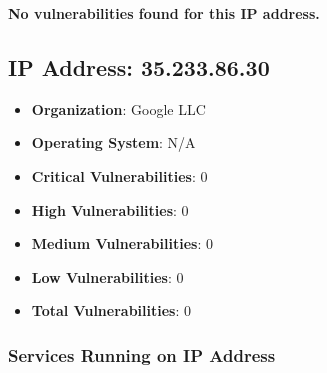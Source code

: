 \documentclass{article}
\begin{document}
\textbf{No vulnerabilities found for this IP address.}




\clearpage



\subsection*{IP Address: 35.233.86.30}

\begin{itemize}
    \item \textbf{Organization}: Google LLC
    \item \textbf{Operating System}:  N/A 
    \item \textbf{Critical Vulnerabilities}: 0
    \item \textbf{High Vulnerabilities}: 0
    \item \textbf{Medium Vulnerabilities}: 0
    \item \textbf{Low Vulnerabilities}: 0
    \item \textbf{Total Vulnerabilities}: 0
\end{itemize}

\subsubsection*{Services Running on IP Address}
\end{document}
